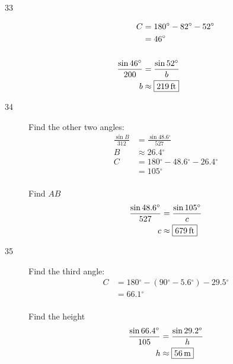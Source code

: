 \documentclass{exam}
\newcommand{\dg}{\ensuremath{^\circ}}
\begin{document}
\begin{description}
      \item[33] 
        \begin{align*}
          C & = 180 \dg - 82 \dg - 52 \dg \\
            & = 46 \dg \\
          \\
          \frac{\sin 46 \dg}{200} & = \frac{\sin 52 \dg}{b} \\
          b                       & \approx \boxed{ \unit[219]{ft} } \\
        \end{align*}

      \pagebreak

      \item[34] 
        Find the other two angles:
        \begin{align*}
          \frac{\sin B}{312} & = \frac{\sin 48.6 \dg}{527} \\
          B                  & \approx 26.4 \dg \\
          C                  & = 180 \dg - 48.6 \dg - 26.4 \dg \\
                             & = 105 \dg \\
        \end{align*}

        Find $AB$
        \begin{align*}
          \frac{\sin 48.6 \dg}{527} & = \frac{\sin 105 \dg}{c} \\
          c                         & \approx \boxed{ \unit[679]{ft} } \\
        \end{align*}

      \item[35] 
        Find the third angle:
        \begin{align*}
          C & = 180 \dg - (90 \dg - 5.6 \dg) - 29.5 \dg \\
            & = 66.1 \dg \\
        \end{align*}

        Find the height
        \begin{align*}
          \frac{\sin 66.4 \dg}{105} & = \frac{\sin 29.2 \dg}{h} \\
          h                         & \approx \boxed{ \unit[56]{m} } \\
        \end{align*}

      \pagebreak


\end{description}
\end{document}

